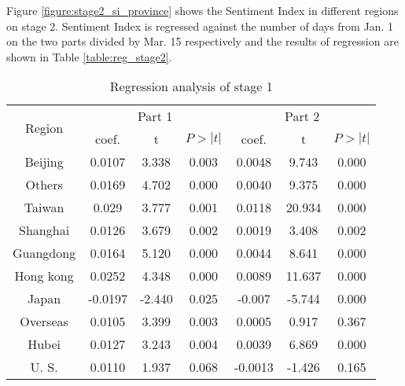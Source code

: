 \documentclass[sigconf, nonacm=true]{acmart}
\begin{document}
Figure \ref{figure:stage2_si_province} shows the Sentiment Index in different regions on stage 2.
Sentiment Index is regressed against the number of days from Jan. 1 on the two parts divided by Mar. 15 respectively and the results of regression are shown in  Table \ref{table:reg_stage2}.
\begin{table}[t]
\small%
\begin{tabular}{|c|c|c|c|c|c|c|}
\hline
\multirow{2}{*}{Region} & \multicolumn{3}{c|}{Part 1} & \multicolumn{3}{c|}{Part 2} \\\cline{2-7}
                  &  coef.     &    t   &   $P>|t|$   &     coef.  &    t   &  $P>|t|$    \\\hline
                  Beijing&  0.0107     &    3.338   &   0.003   &   0.0048    &  9.743     &  0.000    \\\hline
      Others        &      0.0169 &     4.702  &  0.000     &   0.0040    &    9.375   &     0.000          \\\hline
        Taiwan          &  0.029   &   3.777    &   0.001   &   0.0118    & 20.934      &  0.000    \\\hline
        Shanghai          &  0.0126     &   3.679    &   0.002   &    0.0019   &    3.408   &   0.002   \\\hline
         Guangdong         &   0.0164    &   5.120    &  0.000    &   0.0044    &   8.641    &   0.000  \\\hline
         Hong kong    &  0.0252    &   4.348    &    0.000   &   0.0089   &   11.637    &    0.000         \\\hline
         Japan &   -0.0197    &    -2.440   &   0.025   &   -0.007    & -5.744      & 0.000     \\\hline
         Overseas &    0.0105   &   3.399    &  0.003    &   0.0005    &  0.917     & 0.367     \\\hline
         Hubei &    0.0127   &   3.243    &  0.004    &  0.0039     &   6.869    &   0.000  \\\hline
         U. S. &    0.0110   &   1.937    & 0.068     &   -0.0013    &    -1.426   &  0.165    \\\hline
\end{tabular}
\caption{Regression analysis of stage 1}
\vspace{-0.3cm}
\label{table:reg_stage1}
\end{table}
\end{document}
